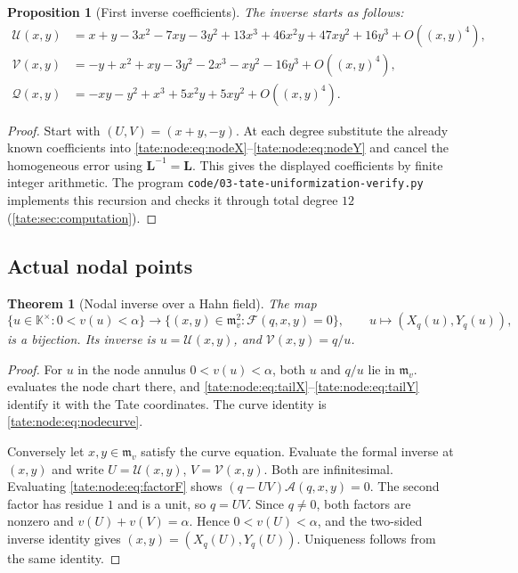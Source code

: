 \documentclass[11pt,letterpaper]{article}
\newtheorem{theorem}{Theorem}[section]
\newtheorem{proposition}[proposition]{Proposition}
\theoremstyle{definition}
\newcommand{\m}{\mathfrak m}
\newcommand{\file}[1]{\nolinkurl{#1}}
\newcommand{\UU}{\mathcal U}
\newcommand{\VV}{\mathcal V}
\newcommand{\QQ}{\mathcal Q}
\newcommand{\Fp}{\mathcal F}
\newcommand{\KK}{\mathbb K}
\newcommand{\bL}{\mathbf L}
\begin{document}
\begin{proposition}[First inverse coefficients]\label{tate:node:prop:coefficients}
The inverse starts as follows:
\begin{align}
 \UU(x,y)&=x+y-3x^2-7xy-3y^2
        +13x^3+46x^2y+47xy^2+16y^3+O((x,y)^4),\label{tate:node:eq:Ucoeff}\\
 \VV(x,y)&=-y+x^2+xy-3y^2
        -2x^3-xy^2-16y^3+O((x,y)^4),\label{tate:node:eq:Vcoeff}\\
 \QQ(x,y)&=-xy-y^2+x^3+5x^2y+5xy^2+O((x,y)^4).\label{tate:node:eq:Qcoeff}
\end{align}
\end{proposition}

\begin{proof}
Start with $(U,V)=(x+y,-y)$. At each degree substitute the already known
coefficients into \eqref{tate:node:eq:nodeX}--\eqref{tate:node:eq:nodeY} and
cancel the homogeneous error using $\bL^{-1}=\bL$. This gives the displayed
coefficients by finite integer arithmetic. The program
\file{code/03-tate-uniformization-verify.py} implements this recursion and
checks it through total degree $12$ (\cref{tate:sec:computation}).
\end{proof}

\subsection{Actual nodal points}

\begin{theorem}[Nodal inverse over a Hahn field]\label{tate:node:thm:nodalsurj}
The map
\begin{equation}
 \{u\in\KK^\times:0<v(u)<\alpha\}
  \longrightarrow
 \{(x,y)\in\m_v^2:\Fp(q,x,y)=0\},
 \qquad u\longmapsto(X_q(u),Y_q(u)),\label{tate:node:eq:nodebijection}
\end{equation}
is a bijection. Its inverse is $u=\UU(x,y)$, and $\VV(x,y)=q/u$.
\end{theorem}

\begin{proof}
For $u$ in the node annulus $0<v(u)<\alpha$, both $u$ and $q/u$ lie in
$\m_v$.  evaluates the node chart there, and
\eqref{tate:node:eq:tailX}--\eqref{tate:node:eq:tailY} identify it with the
Tate coordinates. The curve identity is \eqref{tate:node:eq:nodecurve}.

Conversely let $x,y\in\m_v$ satisfy the curve equation. Evaluate the formal
inverse at $(x,y)$ and write $U=\UU(x,y)$, $V=\VV(x,y)$. Both are
infinitesimal. Evaluating \eqref{tate:node:eq:factorF} shows
$(q-UV)\mathcal A(q,x,y)=0$. The second factor has residue $1$ and is a unit,
so $q=UV$. Since $q\ne0$, both factors are nonzero and
$v(U)+v(V)=\alpha$. Hence $0<v(U)<\alpha$, and the two-sided inverse
identity gives $(x,y)=(X_q(U),Y_q(U))$. Uniqueness follows from the same
identity.
\end{proof}
\end{document}
